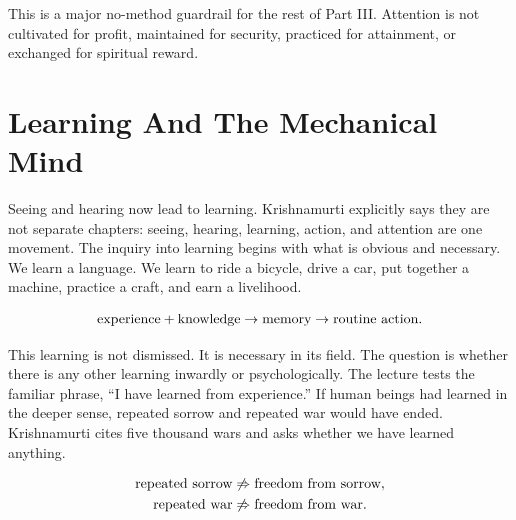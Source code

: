 \documentclass[11pt,oneside]{book}
\begin{document}
\begin{figure}
\centering
{}
\end{figure}

This is a major no-method guardrail for the rest of Part III. Attention is not cultivated for profit, maintained for security, practiced for attainment, or exchanged for spiritual reward.

\section{Learning And The Mechanical Mind}

Seeing and hearing now lead to learning. Krishnamurti explicitly says they are not separate chapters: seeing, hearing, learning, action, and attention are one movement. The inquiry into learning begins with what is obvious and necessary. We learn a language. We learn to ride a bicycle, drive a car, put together a machine, practice a craft, and earn a livelihood.

\begin{equation}
\hbox{experience}+\hbox{knowledge}
\to
\hbox{memory}
\to
\hbox{routine action}.
\end{equation}

This learning is not dismissed. It is necessary in its field. The question is whether there is any other learning inwardly or psychologically. The lecture tests the familiar phrase, ``I have learned from experience.'' If human beings had learned in the deeper sense, repeated sorrow and repeated war would have ended. Krishnamurti cites five thousand wars and asks whether we have learned anything.

\begin{align}
\hbox{repeated sorrow}
&\not\Rightarrow
\hbox{freedom from sorrow},\\
\hbox{repeated war}
&\not\Rightarrow
\hbox{freedom from war}.
\end{align}
\end{document}
